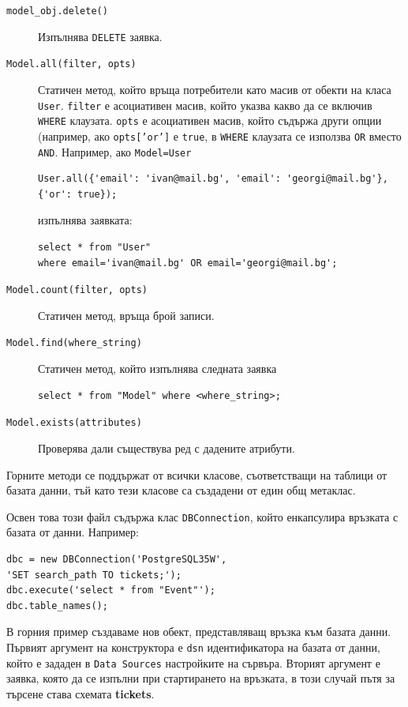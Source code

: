 \documentclass[a4paper,10pt, leqno]{article}
\newcommand{\tab}[1] {\textbf{#1}}
\begin{document}
\begin{description}
\begin{description}
                \item[\texttt{model\_obj.delete()}] Изпълнява \texttt{DELETE} заявка.
                \item[\texttt{Model.all(filter, opts)}] Статичен метод, който връща потребители като масив от обекти на класа \texttt{User}.
                    \texttt{filter} е асоциативен масив, който указва какво да се включив \texttt{WHERE} клаузата.
                    \texttt{opts} е асоциативен масив, който съдържа други опции (например, ако \texttt{opts['or']} е \texttt{true},
                    в \texttt{WHERE} клаузата се използва \texttt{OR} вместо \texttt{AND}.
                    Например, ако \texttt{Model=User}
\begin{verbatim}
User.all({'email': 'ivan@mail.bg', 'email': 'georgi@mail.bg'},
{'or': true});
\end{verbatim}
                    изпълнява заявката:
\begin{verbatim}
select * from "User"
where email='ivan@mail.bg' OR email='georgi@mail.bg';
\end{verbatim}
                \item[\texttt{Model.count(filter, opts)}] Статичен метод, връща брой записи.
                \item[\texttt{Model.find(where\_string)}] Статичен метод, който изпълнява следната заявка
\begin{verbatim}
select * from "Model" where <where_string>;
\end{verbatim}
                \item[\texttt{Model.exists(attributes)}] Проверява дали съществува ред с дадените атрибути.
            \end{description}

            Горните методи се поддържат от всички класове, съответстващи на таблици от базата данни, тъй като тези класове
            са създадени от един общ метаклас.

            Освен това този файл съдържа клас \texttt{DBConnection}, който енкапсулира връзката с базата от данни.
            Например:

\begin{verbatim}
dbc = new DBConnection('PostgreSQL35W',
'SET search_path TO tickets;');
dbc.execute('select * from "Event"');
dbc.table_names();
\end{verbatim}

            В горния пример създаваме нов обект, представляващ връзка към базата данни.
            Първият аргумент на конструктора е \texttt{dsn} идентификатора на базата от данни, който
            е зададен в \texttt{Data Sources} настройките на сървъра. Вторият аргумент е заявка, която да се изпълни при стартирането
            на връзката, в този случай пътя за търсене става схемата \tab{tickets}.


\end{description}
\end{document}
